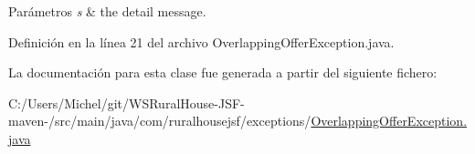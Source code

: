 \begin{DoxyParams}{Parámetros}
{\em s} & the detail message. \\
\hline
\end{DoxyParams}


Definición en la línea 21 del archivo Overlapping\+Offer\+Exception.\+java.



La documentación para esta clase fue generada a partir del siguiente fichero\+:\begin{DoxyCompactItemize}
\item 
C\+:/\+Users/\+Michel/git/\+W\+S\+Rural\+House-\/\+J\+S\+F-\/maven-\//src/main/java/com/ruralhousejsf/exceptions/\mbox{\hyperlink{_overlapping_offer_exception_8java}{Overlapping\+Offer\+Exception.\+java}}\end{DoxyCompactItemize}

